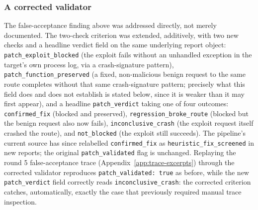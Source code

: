 \documentclass[12pt,a4paper]{report}
\begin{document}
\subsubsection*{A corrected validator}
\label{sec:corrected-validator}

The false-acceptance finding above was addressed directly, not merely documented. The two-check criterion was extended, additively, with two new checks and a headline verdict field on the same underlying report object: \texttt{patch\_exploit\_blocked} (the exploit fails without an unhandled exception in the target's own process log, via a crash-signature pattern), \texttt{patch\_function\_preserved} (a fixed, non-malicious benign request to the same route completes without that same crash-signature pattern; precisely what this field does and does not establish is stated below, since it is weaker than it may first appear), and a headline \texttt{patch\_verdict} taking one of four outcomes: \texttt{confirmed\_fix} (blocked and preserved), \texttt{regression\_broke\_route} (blocked but the benign request also now fails), \texttt{inconclusive\_crash} (the exploit request itself crashed the route), and \texttt{not\_blocked} (the exploit still succeeds). The pipeline's current source has since relabelled \texttt{confirmed\_fix} as \texttt{heuristic\_fix\_screened} in new reports; the original \texttt{patch\_validated} flag is unchanged. Replaying the round 5 false-acceptance trace (Appendix~\ref{app:trace-excerpts}) through the corrected validator reproduces \texttt{patch\_validated: true} as before, while the new \texttt{patch\_verdict} field correctly reads \texttt{inconclusive\_crash}: the corrected criterion catches, automatically, exactly the case that previously required manual trace inspection.
\end{document}
